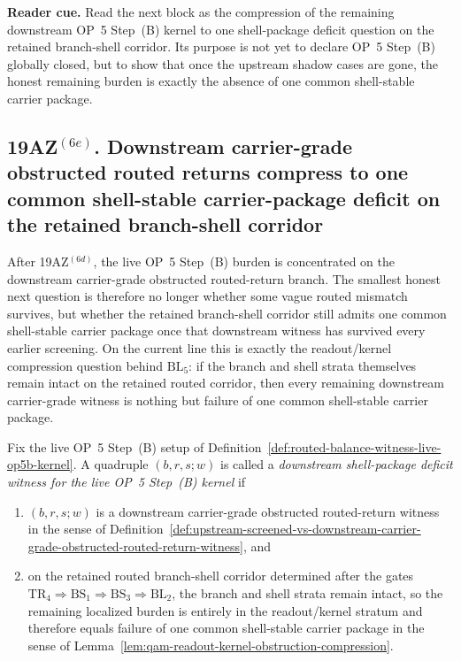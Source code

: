 \noindent\textbf{Reader cue.} Read the next block as the compression of the remaining downstream OP~5 Step~(B) kernel to one shell-package deficit question on the retained branch-shell corridor. Its purpose is not yet to declare OP~5 Step~(B) globally closed, but to show that once the upstream shadow cases are gone, the honest remaining burden is exactly the absence of one common shell-stable carrier package.

\subsection*{19AZ$^{(6e)}$. Downstream carrier-grade obstructed routed returns compress to one common shell-stable carrier-package deficit on the retained branch-shell corridor}
\label{sec:downstream-carrier-grade-obstructed-routed-returns-compress-shell-stable-carrier-package-deficit}
After 19AZ$^{(6d)}$, the live OP~5 Step~(B) burden is concentrated on the downstream carrier-grade obstructed routed-return branch. The smallest honest next question is therefore no longer whether some vague routed mismatch survives, but whether the retained branch-shell corridor still admits one common shell-stable carrier package once that downstream witness has survived every earlier screening. On the current line this is exactly the readout/kernel compression question behind \(\mathrm{BL}_5\): if the branch and shell strata themselves remain intact on the retained routed corridor, then every remaining downstream carrier-grade witness is nothing but failure of one common shell-stable carrier package.

\begin{definition}
\label{def:downstream-shell-package-deficit-witness-live-op5b-kernel}
Fix the live OP~5 Step~(B) setup of Definition~\ref{def:routed-balance-witness-live-op5b-kernel}. A quadruple $(b,r,s;w)$ is called a \emph{downstream shell-package deficit witness for the live OP~5 Step~(B) kernel} if
\begin{enumerate}[leftmargin=2em,label=(\roman*)]
  \item $(b,r,s;w)$ is a downstream carrier-grade obstructed routed-return witness in the sense of Definition~\ref{def:upstream-screened-vs-downstream-carrier-grade-obstructed-routed-return-witness}, and
  \item on the retained routed branch-shell corridor determined after the gates \(\mathrm{TR}_4\Rightarrow\mathrm{BS}_1\Rightarrow\mathrm{BS}_3\Rightarrow\mathrm{BL}_2\), the branch and shell strata remain intact, so the remaining localized burden is entirely in the readout/kernel stratum and therefore equals failure of one common shell-stable carrier package in the sense of Lemma~\ref{lem:qam-readout-kernel-obstruction-compression}.
\end{enumerate}
\end{definition}

